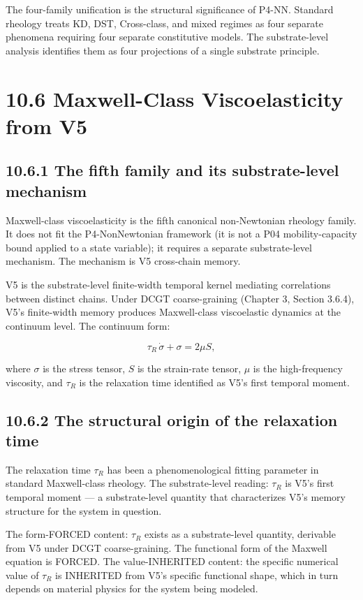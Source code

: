 \documentclass[11pt]{book}
\begin{document}
The four-family unification is the structural significance of P4-NN. Standard rheology treats KD, DST, Cross-class, and mixed regimes as four separate phenomena requiring four separate constitutive models. The substrate-level analysis identifies them as four projections of a single substrate principle.

\section{10.6 Maxwell-Class Viscoelasticity from V5}

\subsection{10.6.1 The fifth family and its substrate-level mechanism}

Maxwell-class viscoelasticity is the fifth canonical non-Newtonian rheology family. It does not fit the P4-NonNewtonian framework (it is not a P04 mobility-capacity bound applied to a state variable); it requires a separate substrate-level mechanism. The mechanism is V5 cross-chain memory.

V5 is the substrate-level finite-width temporal kernel mediating correlations between distinct chains. Under DCGT coarse-graining (Chapter 3, Section 3.6.4), V5's finite-width memory produces Maxwell-class viscoelastic dynamics at the continuum level. The continuum form:

\[
\tau_R\,\dot\sigma + \sigma = 2\mu S,
\]

where $\sigma$ is the stress tensor, $S$ is the strain-rate tensor, $\mu$ is the high-frequency viscosity, and $\tau_R$ is the relaxation time identified as V5's first temporal moment.

\subsection{10.6.2 The structural origin of the relaxation time}

The relaxation time $\tau_R$ has been a phenomenological fitting parameter in standard Maxwell-class rheology. The substrate-level reading: $\tau_R$ is V5's first temporal moment — a substrate-level quantity that characterizes V5's memory structure for the system in question.

The form-FORCED content: $\tau_R$ exists as a substrate-level quantity, derivable from V5 under DCGT coarse-graining. The functional form of the Maxwell equation is FORCED. The value-INHERITED content: the specific numerical value of $\tau_R$ is INHERITED from V5's specific functional shape, which in turn depends on material physics for the system being modeled.
\end{document}
